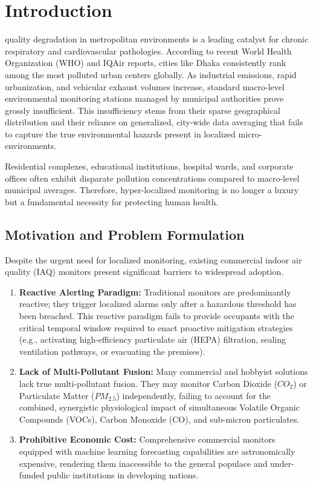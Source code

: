\documentclass[12pt,journal,onecolumn,a4paper]{IEEEtran}
\begin{document}
\section{Introduction}
 quality degradation in metropolitan environments is a leading catalyst for chronic respiratory and cardiovascular pathologies. According to recent World Health Organization (WHO) and IQAir reports, cities like Dhaka consistently rank among the most polluted urban centers globally. As industrial emissions, rapid urbanization, and vehicular exhaust volumes increase, standard macro-level environmental monitoring stations managed by municipal authorities prove grossly insufficient. This insufficiency stems from their sparse geographical distribution and their reliance on generalized, city-wide data averaging that fails to capture the true environmental hazards present in localized micro-environments.

Residential complexes, educational institutions, hospital wards, and corporate offices often exhibit disparate pollution concentrations compared to macro-level municipal averages. Therefore, hyper-localized monitoring is no longer a luxury but a fundamental necessity for protecting human health. 

\subsection{Motivation and Problem Formulation}
Despite the urgent need for localized monitoring, existing commercial indoor air quality (IAQ) monitors present significant barriers to widespread adoption. 
\begin{enumerate}
    \item \textbf{Reactive Alerting Paradigm:} Traditional monitors are predominantly reactive; they trigger localized alarms only after a hazardous threshold has been breached. This reactive paradigm fails to provide occupants with the critical temporal window required to enact proactive mitigation strategies (e.g., activating high-efficiency particulate air (HEPA) filtration, sealing ventilation pathways, or evacuating the premises).
    \item \textbf{Lack of Multi-Pollutant Fusion:} Many commercial and hobbyist solutions lack true multi-pollutant fusion. They may monitor Carbon Dioxide ($CO_2$) or Particulate Matter ($PM_{2.5}$) independently, failing to account for the combined, synergistic physiological impact of simultaneous Volatile Organic Compounds (VOCs), Carbon Monoxide (CO), and sub-micron particulates.
    \item \textbf{Prohibitive Economic Cost:} Comprehensive commercial monitors equipped with machine learning forecasting capabilities are astronomically expensive, rendering them inaccessible to the general populace and under-funded public institutions in developing nations.
\end{enumerate}
\end{document}
